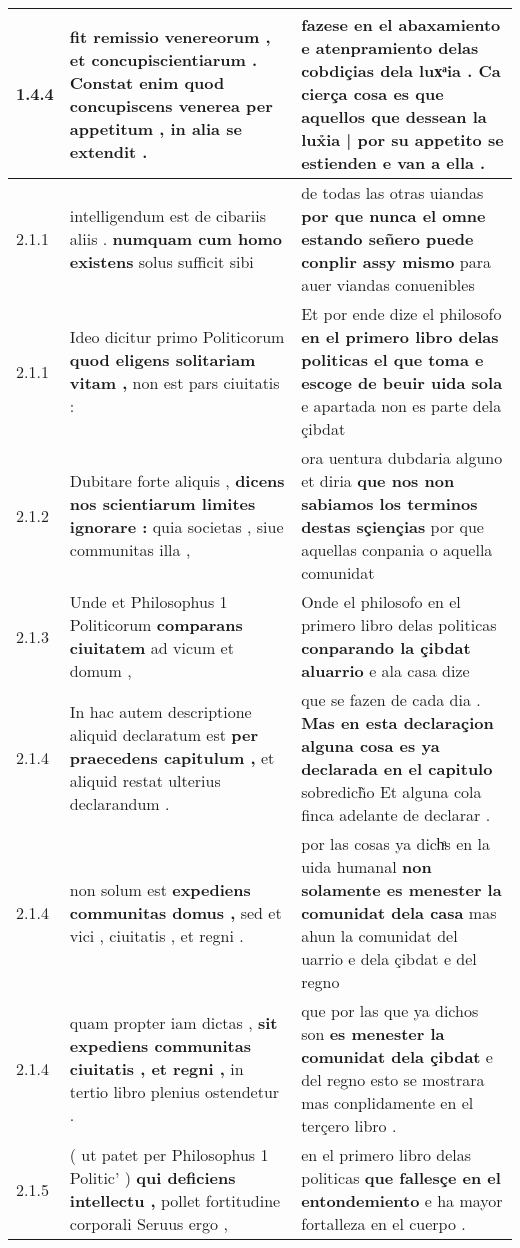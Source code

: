 \begin{tabular}{|p{1cm}|p{6.5cm}|p{6.5cm}|}
1.4.4 & fit remissio venereorum , \textbf{ et concupiscientiarum . Constat enim quod concupiscens venerea per appetitum , } in alia se extendit . & fazese en el abaxamiento e atenpramiento delas cobdiçias dela luxͣia . \textbf{ Ca cierça cosa es que aquellos que dessean la lux̉ia | por su appetito se estienden } e van a ella . \\\hline
2.1.1 & intelligendum est de cibariis aliis . \textbf{ numquam cum homo existens } solus sufficit sibi & de todas las otras uiandas \textbf{ por que nunca el omne estando señero puede conplir assy mismo } para auer viandas conuenibles \\\hline
2.1.1 & Ideo dicitur primo Politicorum \textbf{ quod eligens solitariam vitam , } non est pars ciuitatis : & Et por ende dize el philosofo \textbf{ en el primero libro delas politicas el que toma e escoge de beuir uida sola } e apartada non es parte dela çibdat \\\hline
2.1.2 & Dubitare forte aliquis , \textbf{ dicens nos scientiarum limites ignorare : } quia societas , siue communitas illa , & ora uentura dubdaria alguno et diria \textbf{ que nos non sabiamos los terminos destas sçiençias } por que aquellas conpania o aquella comunidat \\\hline
2.1.3 & Unde et Philosophus 1 Politicorum \textbf{ comparans ciuitatem } ad vicum et domum , & Onde el philosofo en el primero libro delas politicas \textbf{ conparando la çibdat aluarrio } e ala casa dize \\\hline
2.1.4 & In hac autem descriptione aliquid declaratum est \textbf{ per praecedens capitulum , } et aliquid restat ulterius declarandum . & que se fazen de cada dia . \textbf{ Mas en esta declaraçion alguna cosa es ya declarada en el capitulo } sobredich̃o Et alguna cola finca adelante de declarar . \\\hline
2.1.4 & non solum est \textbf{ expediens communitas domus , } sed et vici , ciuitatis , et regni . & por las cosas ya dichͣs en la uida humanal \textbf{ non solamente es menester la comunidat dela casa } mas ahun la comunidat del uarrio e dela çibdat e del regno \\\hline
2.1.4 & quam propter iam dictas , \textbf{ sit expediens communitas ciuitatis , et regni , } in tertio libro plenius ostendetur . & que por las que ya dichos son \textbf{ es menester la comunidat dela çibdat } e del regno esto se mostrara mas conplidamente en el terçero libro . \\\hline
2.1.5 & ( ut patet per Philosophus 1 Politic’ ) \textbf{ qui deficiens intellectu , } pollet fortitudine corporali Seruus ergo , & en el primero libro delas politicas \textbf{ que fallesçe en el entondemiento } e ha mayor fortalleza en el cuerpo . \\\hline

\end{tabular}
